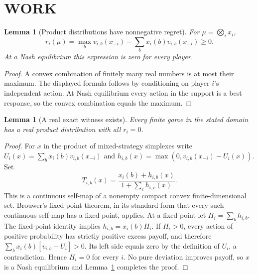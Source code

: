 \documentclass[11pt,a4paper]{article}
\newtheorem{lemma}[theorem]{Lemma}
\theoremstyle{definition}\newtheorem{definition}[theorem]{Definition}
\theoremstyle{remark}\newtheorem{remark}[theorem]{Remark}
\newcommand{\1}{\mathbf 1}
\begin{document}
\section{WORK}
\begin{lemma}[Product distributions have nonnegative regret]\label{lem:product}
For $\mu=\bigotimes_i x_i$,
\[
 r_i(\mu)=\max_b v_{i,b}(x_{-i})-
             \sum_bx_i(b)v_{i,b}(x_{-i})\ge0.
\]
At a Nash equilibrium this expression is zero for every player.
\end{lemma}
\begin{proof}
A convex combination of finitely many real numbers is at most their maximum. The displayed formula follows by conditioning on player $i$'s independent action. At Nash equilibrium every action in the support is a best response, so the convex combination equals the maximum.
\end{proof}

\begin{lemma}[A real exact witness exists]\label{lem:nash}
Every finite game in the stated domain has a real product distribution with all $r_i=0$.
\end{lemma}
\begin{proof}
For $x$ in the product of mixed-strategy simplexes write
$U_i(x)=\sum_bx_i(b)v_{i,b}(x_{-i})$ and
$h_{i,b}(x)=\max(0,v_{i,b}(x_{-i})-U_i(x))$. Set
\[
 T_{i,b}(x)=\frac{x_i(b)+h_{i,b}(x)}{1+\sum_ch_{i,c}(x)}.
\]
This is a continuous self-map of a nonempty compact convex finite-dimensional set. Brouwer's fixed-point theorem, in its standard form that every such continuous self-map has a fixed point, applies. At a fixed point let $H_i=\sum_bh_{i,b}$. The fixed-point identity implies $h_{i,b}=x_i(b)H_i$. If $H_i>0$, every action of positive probability has strictly positive excess payoff, and therefore
$\sum_bx_i(b)[v_{i,b}-U_i]>0$. Its left side equals zero by the definition of $U_i$, a contradiction. Hence $H_i=0$ for every $i$. No pure deviation improves payoff, so $x$ is a Nash equilibrium and Lemma~\ref{lem:product} completes the proof.
\end{proof}
\end{document}
